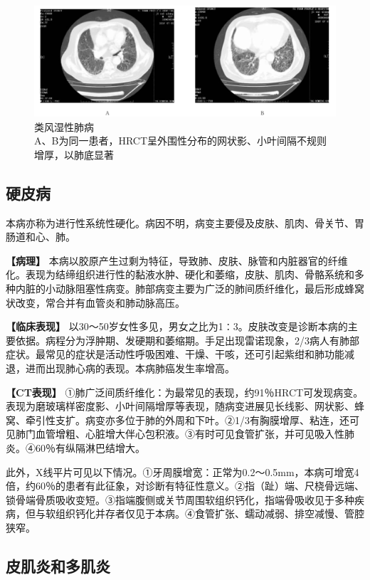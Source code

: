 \begin{figure}[!htbp]
 \centering
 \includegraphics[width=.7\textwidth,height=\textheight,keepaspectratio]{./images/Image00230.jpg}
 \captionsetup{justification=centering}
 \caption{类风湿性肺病\\{\small A、B为同一患者，HRCT呈外围性分布的网状影、小叶间隔不规则增厚，以肺底显著}}
 \label{fig9-39}
  \end{figure} 

\subsection{硬皮病}

本病亦称为进行性系统性硬化。病因不明，病变主要侵及皮肤、肌肉、骨关节、胃肠道和心、肺。

\textbf{【病理】}
本病以胶原产生过剩为特征，导致肺、皮肤、脉管和内脏器官的纤维化。表现为结缔组织进行性的黏液水肿、硬化和萎缩，皮肤、肌肉、骨骼系统和多种内脏的小动脉阻塞性病变。肺部病变主要为广泛的肺间质纤维化，最后形成蜂窝状改变，常合并有血管炎和肺动脉高压。

\textbf{【临床表现】}
以30～50岁女性多见，男女之比为1∶3。皮肤改变是诊断本病的主要依据。病程分为浮肿期、发硬期和萎缩期。手足出现雷诺现象，2/3病人有肺部症状。最常见的症状是活动性呼吸困难、干燥、干咳，还可引起紫绀和肺功能减退，进而出现肺心病的表现。本病肺癌发生率增高。

\textbf{【CT表现】}
①肺广泛间质纤维化：为最常见的表现，约91％HRCT可发现病变。表现为磨玻璃样密度影、小叶间隔增厚等表现，随病变进展见长线影、网状影、蜂窝、牵引性支扩。病变亦多位于肺的外周和下叶。②1/3有胸膜增厚、粘连，还可见肺门血管增粗、心脏增大伴心包积液。③有时可见食管扩张，并可见吸入性肺炎。④60％有纵隔淋巴结增大。

此外，X线平片可见以下情况。①牙周膜增宽：正常为0.2～0.5mm，本病可增宽4倍，约60％的患者有此征象，对诊断有特征性意义。②指（趾）端、尺桡骨远端、锁骨端骨质吸收变短。③指端腹侧或关节周围软组织钙化，指端骨吸收见于多种疾病，但与软组织钙化并存者仅见于本病。④食管扩张、蠕动减弱、排空减慢、管腔狭窄。

\subsection{皮肌炎和多肌炎}

